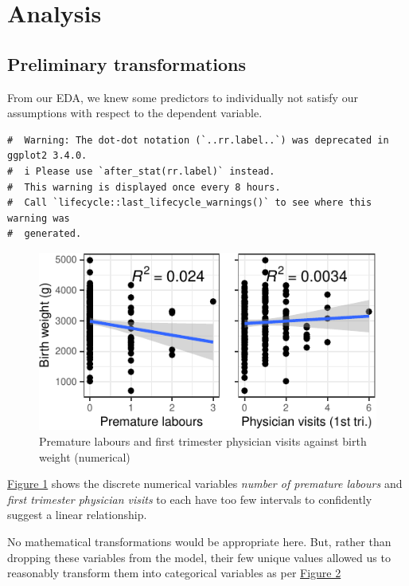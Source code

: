 \documentclass[letterpaper,9pt,twocolumn,twoside,]{pinp}
\begin{document}
\section{Analysis}\label{analysis}

\subsection{Preliminary
transformations}\label{preliminary-transformations}

From our EDA, we knew some predictors to individually not satisfy our
assumptions with respect to the dependent variable.

\begin{ShadedResult}
\begin{verbatim}
#  Warning: The dot-dot notation (`..rr.label..`) was deprecated in ggplot2 3.4.0.
#  i Please use `after_stat(rr.label)` instead.
#  This warning is displayed once every 8 hours.
#  Call `lifecycle::last_lifecycle_warnings()` to see where this warning was
#  generated.
\end{verbatim}
\end{ShadedResult}
\begin{figure}

{\centering \includegraphics{Executive-Summary_files/figure-latex/fig1-1} 

}

\caption{Premature labours and first trimester physician visits against birth weight (numerical)}\label{fig:fig1}
\end{figure}

\href{fig1}{Figure 1} shows the discrete numerical variables
\emph{number of premature labours} and \emph{first trimester physician
visits} to each have too few intervals to confidently suggest a linear
relationship.

No mathematical transformations would be appropriate here. But, rather
than dropping these variables from the model, their few unique values
allowed us to reasonably transform them into categorical variables as
per \href{fig2}{Figure 2} \small
\end{document}
